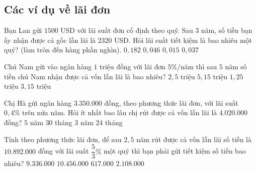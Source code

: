 \subsection{Các ví dụ về lãi đơn}

\begin{vd}%
	Bạn Lan gửi $1500$ USD với lãi suất đơn cố định theo quý. Sau 3 năm, số tiền bạn ấy nhận được cả gốc lẫn lãi là $2320$ USD. Hỏi lãi suất tiết kiệm là bao nhiêu một quý? (làm tròn đến hàng phần nghìn).\newline
	\choice
	{$0,182$}
	{\True $0,046$}
	{$0,015$}
	{$0,037$}
\end{vd}

\begin{vd}%
	Chú Nam gửi vào ngân hàng $1$ triệu đồng với lãi đơn $5\%$/năm thì sau $5$ năm số tiền chú Nam nhận được cả vốn lẫn lãi là bao nhiêu?\newline
	\choice
	{$2,5$ triệu}
	{$5,15$ triệu}
	{\True $1,25$ triệu}
	{$3,15$ triệu}
\end{vd}

\begin{vd}%
	Chị Hà gửi ngân hàng $3.350.000$ đồng, theo phương thức lãi đơn, với lãi suất $0,4\% $ trên nửa năm. Hỏi ít nhất bao lâu chị rút được cả vốn lẫn lãi là $4.020.000$ đồng?\newline
	\choice
	{$5$ năm}
	{\True $30$ tháng}
	{$3$ năm}
	{$24$ tháng}
\end{vd}

\begin{vd}%
	Tính theo phương thức lãi đơn, để sau $2,5$ năm rút được cả vốn lẫn lãi số tiền là $10.892.000$ đồng với lãi suất $\dfrac{5}{3}\% $ một quý thì bạn phải gửi tiết kiệm số tiền bao nhiêu?\newline
	\choice
	{\True $9.336.000$}
	{$10.456.000$}
	{$617.000$}
	{$2.108.000$}
\end{vd}

